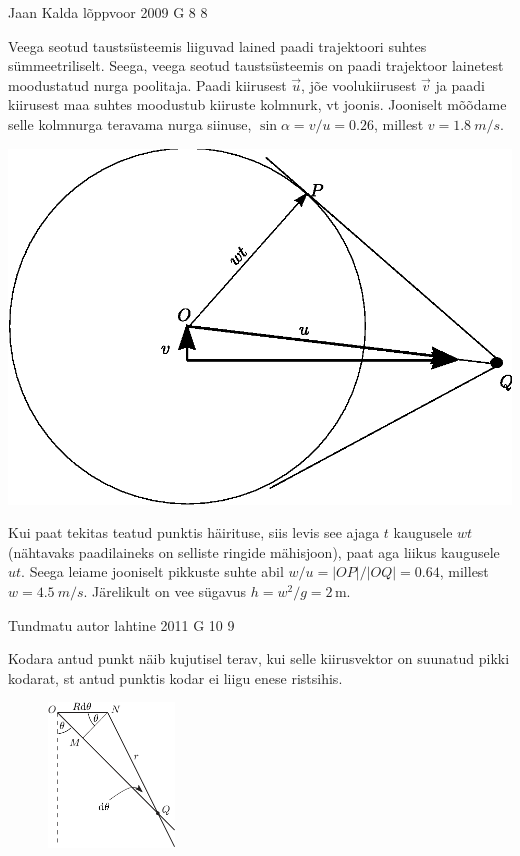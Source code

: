 \documentclass[11pt]{article}
\begin{document}
{%
{Jaan Kalda} %
{lõppvoor} %
{2009} %
{G 8} %
{8} %
{

\ifSolution
\osa
Veega seotud taustsüsteemis liiguvad lained paadi trajektoori suhtes sümmeetriliselt. Seega, veega seotud taustsüsteemis on
paadi trajektoor lainetest moodustatud nurga poolitaja. Paadi kiirusest $\vec u$, jõe voolukiirusest $\vec v$ ja paadi kiirusest maa suhtes moodustub kiiruste kolmnurk, vt joonis.
Jooniselt mõõdame selle kolmnurga teravama nurga siinuse, $\sin \alpha =v/u=\num{0.26}$, millest $v=\SI{1.8}{m/s}$.

\begin{center}
	\includegraphics[width=0.8\linewidth]{2009-v3g-08-paatlah.eps}
\end{center}

\osa
Kui paat tekitas teatud punktis häirituse, siis levis see ajaga $t$ kaugusele $wt$ (nähtavaks paadilaineks on selliste ringide mähisjoon),
paat aga liikus kaugusele $ut$. Seega leiame jooniselt pikkuste suhte abil $w/u=|OP|/|OQ|=\num{0.64}$, millest $w=\SI{4.5}{m/s}$. Järelikult on vee sügavus
$h=w^2/g=2\,$m.
\fi
}

{Tundmatu autor} %
{lahtine} %
{2011} %
{G 10} %
{9} %
{

\ifSolution
Kodara antud punkt näib kujutisel terav, kui selle kiirusvektor on suunatud pikki kodarat, st antud punktis kodar ei liigu enese ristsihis.

\begin{figure}
	\vspace*{-15pt}
	\includegraphics[width=0.3\textwidth]{2011-lahg-10-kodar_a}
	\vspace*{-25pt}
\end{figure}

}}
\end{document}
